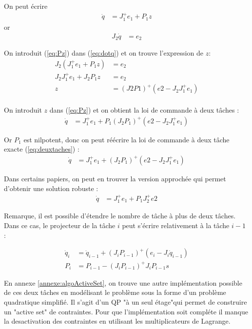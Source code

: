 \documentclass[a4paper, 10pt ]{article}
\begin{document}
On peut écrire
\begin{align}
\dot{q}&=J_1^+e_1+P_1z
\label{eq:Pz}
\end{align}
or
\begin{align}
J_2 \dot{q}&=e_2
\label{eq:dotq}
\end{align}

On introduit (\ref{eq:Pz}) dans (\ref{eq:dotq}) et on trouve l'expression de $z$: 
\begin{align}
J_2 (J_1^+e_1+P_1z)&=e_2\\
J_2  J_1^+e_1+ J_2P_1z&=e_2\\
z&= (J2P1)^+(e2-J_2J_1^+e_1)\\
\label{eq:z}
\end{align}

On introduit $z$ dans (\ref{eq:Pz}) et on obtient la loi de commande à deux tâches : 
\begin{align}
\dot{q}&=J_1^+e_1+P_1 (J_2P_1)^+(e2-J_2J_1^+e_1)
\label{eq:deuxtaches}
\end{align}

Or $P_1$ est nilpotent, donc on peut réécrire la loi de commande à deux tâche exacte (\ref{eq:deuxtaches})  :
\begin{align}
\dot{q}&=J_1^+e_1 + (J_2P_1)^+(e2-J_2J_1^+e_1)
\label{eq:deuxtachesfinal}
\end{align}

Dans certains papiers, on peut en trouver la version approchée qui permet d'obtenir une solution robuste : 
\begin{align}
\dot{q}&=J_1^+e_1 + P_1J_2^+e2
\label{eq:robuste}
\end{align}


Remarque, il est possible d'étendre le nombre de tâche à plus de deux tâches. Dans ce cas, le projecteur de la tâche $i$ peut s'écrire relativement à la tâche $i-1$ :

\begin{align}
\dot{q}_i &= \dot{q}_{i-1} + (J_iP_{i-1})^+(e_i-J_i\dot{q}_{i-1})\\
P_i&=P_{i-1}-(J_iP_{i-1})^+J_iP_{i-1}s
\end{align} 

En annexe \ref{annexe:algoActiveSet}, on trouve une autre implémentation possible de ces deux tâches en modélisant le problème sous la forme d'un problème quadratique simplifié. Il s'agit d'un QP "à un seul étage"qui permet de construire un "active set" de contraintes. Pour que l'implémentation soit compléte il manque la desactivation des contraintes en utilisant les multiplicateurs de Lagrange.
\end{document}
